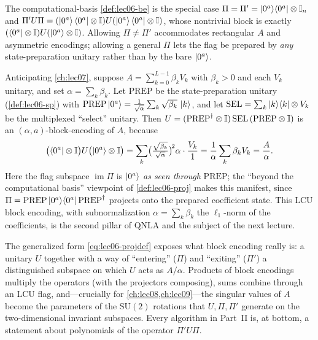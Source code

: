 The computational-basis \cref{def:lec06-be} is the special case
$\Pi=\Pi'=\ket{0^a}\!\bra{0^a}\otimes\mathbb{I}_n$ and $\Pi'U\Pi=(\ket{0^a}\bra{0^a}\otimes\mathbb{I})U
(\ket{0^a}\bra{0^a}\otimes\mathbb{I})$, whose nontrivial block is exactly
$(\bra{0^a}\otimes\mathbb{I})U(\ket{0^a}\otimes\mathbb{I})$. Allowing $\Pi\neq\Pi'$ accommodates
rectangular $A$ and asymmetric encodings; allowing a general $\Pi$ lets the flag be
prepared by \emph{any} state-preparation unitary rather than by the bare $\ket{0^a}$.

\begin{example}
\label{exa:lec06-lcu}
Anticipating \cref{ch:lec07}, suppose $A=\sum_{k=0}^{L-1}\beta_k V_k$ with
$\beta_k>0$ and each $V_k$ unitary, and set $\alpha=\sum_k\beta_k$. Let $\mathrm{PREP}$
be the state-preparation unitary (\cref{def:lec06-sp}) with
$\mathrm{PREP}\ket{0^a}=\frac{1}{\sqrt\alpha}\sum_k\sqrt{\beta_k}\,\ket{k}$, and let
$\mathrm{SEL}=\sum_k\ket{k}\!\bra{k}\otimes V_k$ be the multiplexed ``select'' unitary. Then
$U=(\mathrm{PREP}^{\dagger}\otimes\mathbb{I})\,\mathrm{SEL}\,(\mathrm{PREP}\otimes\mathbb{I})$ is an
$(\alpha,a)$-block-encoding of $A$, because
\[
  \bigl(\bra{0^a}\otimes\mathbb{I}\bigr)U\bigl(\ket{0^a}\otimes\mathbb{I}\bigr)
  =\sum_k\bigl(\tfrac{\sqrt{\beta_k}}{\sqrt\alpha}\bigr)^{\!2}\alpha\cdot
   \frac{V_k}{1}
  =\frac{1}{\alpha}\sum_k\beta_k V_k=\frac{A}{\alpha}.
\]
Here the flag subspace $\operatorname{im}\Pi$ is $\ket{0^a}$ \emph{as seen through}
$\mathrm{PREP}$; the ``beyond the computational basis'' viewpoint of
\cref{def:lec06-proj} makes this manifest, since $\Pi=\mathrm{PREP}\ket{0^a}\!\bra{0^a}
\mathrm{PREP}^{\dagger}$ projects onto the prepared coefficient state. This LCU block
encoding, with subnormalization $\alpha=\sum_k\beta_k$ the $\ell_1$-norm of the
coefficients, is the second pillar of QNLA and the subject of the next lecture.
\end{example}

\begin{remark}
\label{rem:lec06-abstraction}
The generalized form \eqref{eq:lec06-projdef} exposes what block encoding really
is: a unitary $U$ together with a way of ``entering'' ($\Pi$) and ``exiting''
($\Pi'$) a distinguished subspace on which $U$ acts as $A/\alpha$. Products of block
encodings multiply the operators (with the projectors composing), sums combine
through an LCU flag, and---crucially for \cref{ch:lec08,ch:lec09}---the singular
values of $A$ become the parameters of the $\mathrm{SU}(2)$ rotations that
$U,\Pi,\Pi'$ generate on the two-dimensional invariant subspaces. Every algorithm in
Part~II is, at bottom, a statement about polynomials of the operator $\Pi'U\Pi$.
\end{remark}

